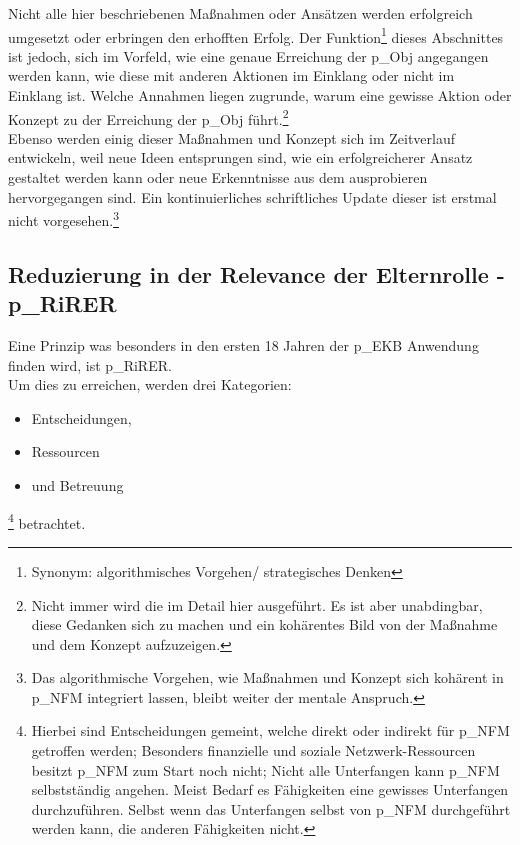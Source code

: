 Nicht alle hier beschriebenen Maßnahmen oder Ansätzen werden erfolgreich umgesetzt oder erbringen den erhofften Erfolg. %
Der Funktion\footnote{
	Synonym: algorithmisches Vorgehen/ strategisches Denken
} dieses Abschnittes ist jedoch, sich im Vorfeld, wie eine genaue Erreichung der \gls{p_Obj} angegangen werden kann, wie diese mit anderen Aktionen im Einklang oder nicht im Einklang ist. Welche Annahmen liegen zugrunde, warum eine gewisse Aktion oder Konzept zu der Erreichung der \gls{p_Obj} führt.\footnote{
	Nicht immer wird die im Detail hier ausgeführt. Es ist aber unabdingbar, diese Gedanken sich zu machen und ein kohärentes Bild von der Maßnahme und dem Konzept aufzuzeigen.
}\\

Ebenso werden einig dieser Maßnahmen und Konzept sich im Zeitverlauf entwickeln, weil neue Ideen entsprungen sind, wie ein erfolgreicherer Ansatz gestaltet werden kann oder neue Erkenntnisse aus dem ausprobieren hervorgegangen sind. Ein kontinuierliches schriftliches Update dieser ist erstmal nicht vorgesehen.\footnote{
	Das algorithmische Vorgehen, wie Maßnahmen und Konzept sich kohärent in \gls{p_NFM} integriert lassen, bleibt weiter der mentale Anspruch.
}

\subsection{Reduzierung in der Relevance der Elternrolle -\gls{p_RiRER}}

Eine Prinzip was besonders in den ersten 18 Jahren der \gls{p_EKB} Anwendung finden wird, ist  \gls{p_RiRER}.\\

Um dies zu erreichen, werden drei Kategorien: 
\begin{itemize}
	\item Entscheidungen,
	\item Ressourcen
	\item und Betreuung
\end{itemize}\footnote{
	Hierbei sind Entscheidungen gemeint, welche direkt oder indirekt für \gls{p_NFM} getroffen werden; Besonders finanzielle und soziale Netzwerk-Ressourcen besitzt \gls{p_NFM} zum Start noch nicht; Nicht alle Unterfangen kann \gls{p_NFM} selbstständig angehen. Meist Bedarf es Fähigkeiten eine gewisses Unterfangen durchzuführen. Selbst wenn das Unterfangen selbst von \gls{p_NFM} durchgeführt werden kann, die anderen Fähigkeiten nicht.
}
betrachtet.
